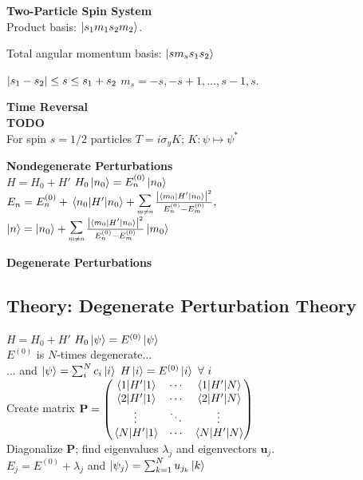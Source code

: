 \documentclass[11pt, a4paper]{article}
\newcommand{\newsec}[1]{\vspace{2mm}\textbf{#1}\\}
\renewcommand{\vec}[1]{\bm{#1}} %
\newcommand{\mat}[1]{\mathbf{#1}} %
\renewcommand{\k}[1]{\ket{#1}}
\newcommand{\tsum}[1]{\raisebox{0.5ex}{\scalebox{0.8}{$\displaystyle \sum_{#1}\,$}}} %
\begin{document}
\begin{multicols}{2}
\newsec{Two-Particle Spin System}
Product basis: $ \ket{s_{1}m_{1}s_{2}m_{2}} $.

Total angular momentum basis: $ \k{sm_{s}s_{1}s_{2}} $

$ \abs{s_{1} - s_{2}} \leq s \leq s_{1} + s_{2}  $ \qquad $ m_{s} = -s, -s+1, \ldots, s-1, s $.



\newsec{Time Reversal}
\textbf{TODO}\\
For spin $ s = 1/2  $ particles $ T = i\sigma_{y}K $; $ K: \psi \mapsto \psi^{*} $



\newsec{Nondegenerate Perturbations}
$ H = H_{0} + H' $ \qquad $ H_{0} \ket{n_{0}} = E^{(0)}_{n} \ket{n_{0}} $ \\
$ E_{n} = E^{(0)}_{n} + \mel{n_{0}}{H'}{n_{0}} + \tsum{m\neq n}\frac{\abs{\mel{m_{0}}{H'}{n_{0}}}^{2}}{E^{(0)}_{n}-E^{(0)}_{m}}, $\\
$ \ket{n} = \ket{n_{0}} + \tsum{m\neq n}\frac{\abs{\bra{m_{0}}H'\ket{n_{0}}}^{2}}{E^{(0)}_{n}-E^{(0)}_{m}} \ket{m_{0}} $


\newsec{Degenerate Perturbations}

\subsection{Theory: Degenerate Perturbation Theory}
$ H = H_{0} + H' $ \qquad $ H_{0} \ket{\psi}  = E^{(0)} \ket{\psi} $\\
$ E^{(0)} $ is $ N $-times degenerate...\\[0.2em]
\null \quad ... and $ \ket{\psi} = \sum_{i}^{N}c_{i}\ket{i} $ \qquad $ H\ket{i} = E^{(0)} \ket{i} \ \forall \ i $\\
Create matrix
$ \mat{P} = 
\begin{pmatrix}
	\mel{1}{H'}{1} &  \cdots & \mel{1}{H'}{N} \\
	\mel{2}{H'}{1} & \cdots & \mel{2}{H'}{N} \\
	\vdots & \ddots & \vdots\\
	\mel{N}{H'}{1} &  \cdots & \mel{N}{H'}{N} 
\end{pmatrix} $\\
Diagonalize $ \mat{P} $; find eigenvalues $ \lambda_{j} $ and eigenvectors $ \vec{u}_{j} $.\\
$ E_{j} = E^{(0)} + \lambda_{j}  $ \qquad and \qquad $ \ket{\psi_{j}} = \sum_{k=1}^{N}u_{j_{k}} \ket{k} $


\end{multicols}
\end{document}
